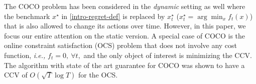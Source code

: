 The COCO problem has been considered in the {\it dynamic} setting as well  \citep{chen2018bandit, cao2018online, vazecocowiopt2022, liu2022simultaneously} where the benchmark $x^\star$ in \eqref{intro-regret-def} is replaced by $x_t^\star$ ($x_t^\star = \arg \min_x f_t(x)$) that is also allowed to change its actions over time. However, in this paper, we focus our entire attention on the static version.
A special case of COCO is the 
online constraint satisfaction (OCS) problem that does not involve any cost function, \emph{i.e.,} $f_t=0, \ \forall t,$ and the only object of interest is minimizing the CCV. The algorithm with state of the art guarantee for COCO \cite{Sinha2024} was shown to have a CCV of $O(\sqrt{T}\log T)$ for the OCS.